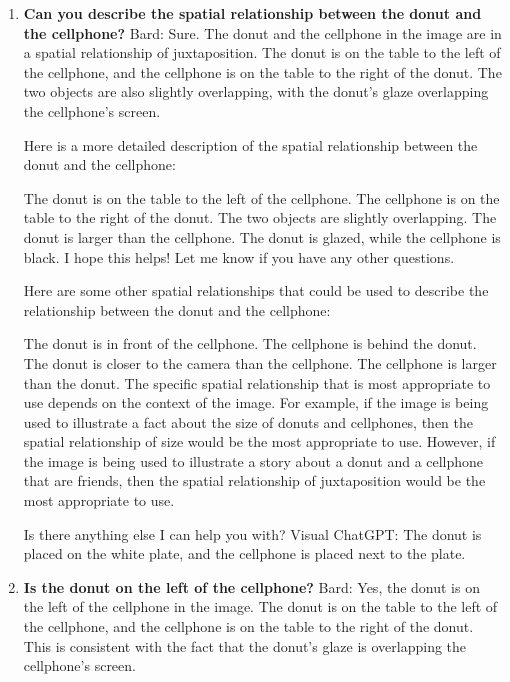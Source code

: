     \begin{enumerate}
        \item \textbf{Can you describe the spatial relationship between the donut and the cellphone?}
        \subitem Bard: Sure. The donut and the cellphone in the image are in a spatial relationship of juxtaposition. The donut is on the table to the left of the cellphone, and the cellphone is on the table to the right of the donut. The two objects are also slightly overlapping, with the donut's glaze overlapping the cellphone's screen.

        Here is a more detailed description of the spatial relationship between the donut and the cellphone:
        
        The donut is on the table to the left of the cellphone.
        The cellphone is on the table to the right of the donut.
        The two objects are slightly overlapping.
        The donut is larger than the cellphone.
        The donut is glazed, while the cellphone is black.
        I hope this helps! Let me know if you have any other questions.
        
        Here are some other spatial relationships that could be used to describe the relationship between the donut and the cellphone:
        
        The donut is in front of the cellphone.
        The cellphone is behind the donut.
        The donut is closer to the camera than the cellphone.
        The cellphone is larger than the donut.
        The specific spatial relationship that is most appropriate to use depends on the context of the image. For example, if the image is being used to illustrate a fact about the size of donuts and cellphones, then the spatial relationship of size would be the most appropriate to use. However, if the image is being used to illustrate a story about a donut and a cellphone that are friends, then the spatial relationship of juxtaposition would be the most appropriate to use.
        
        Is there anything else I can help you with?
        \subitem Visual ChatGPT: The donut is placed on the white plate, and the cellphone is placed next to the plate.
        \item \textbf{Is the donut on the left of the cellphone?}
        \subitem Bard: 
        Yes, the donut is on the left of the cellphone in the image. The donut is on the table to the left of the cellphone, and the cellphone is on the table to the right of the donut. This is consistent with the fact that the donut's glaze is overlapping the cellphone's screen.
        

\end{enumerate}
